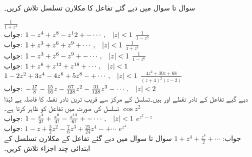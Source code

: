 سوال  تا سوال  میں دیے گئے تفاعل کا مکلارن تسلسل تلاش کریں۔

\quad
$\tfrac{1}{1+z^4}$\\
جواب:\quad
$1-z^4+z^8-z^12+-\cdots,\quad \abs{z}<1$
\quad
$\tfrac{1}{1-z^3}$\\
جواب:\quad
$1+z^3+z^6+z^9+\cdots,\quad \abs{z}<1$
\quad
$\tfrac{1}{1+z^3}$\\
جواب:\quad
$1-z^3+z^6-z^9+-\cdots,\quad \abs{z}<1$
\quad
$\tfrac{1}{1-z^6}$\\
جواب:\quad
$1+z^6+z^{12}+z^{18}+\cdots,\quad \abs{z}<1$\\
$1-2z^2+3z^4-4z^6+5z^8-+\cdots,\quad \abs{z}<1$
\quad
$\tfrac{4z^2+30z+68}{(z+4)^2(z-2)}$\\
جواب:\quad
$-\tfrac{17}{8}-\tfrac{15}{16}z-\tfrac{67}{128}z^2-\tfrac{31}{128}z^3-\cdots,\quad \abs{z}<2$\\
دیے گیے تفاعل کے نادر نقطے   اور  ہیں۔تسلسل کے مرکز  سے قریب ترین نادر نقطہ کا فاصلہ  ہے لہٰذا تسلسل  کی صورت میں تفاعل کو ظاہر کرتا ہے۔ 
\quad 
$\cos z^2$\\
جواب:\quad
$1-\tfrac{z^4}{2!}+\tfrac{z^8}{4!}-\tfrac{z^{12}}{6!}+-\cdots, \quad \abs{z}<1$
\quad 
$e^{z^2-z}$\\
جواب:\quad
$1-z+\tfrac{3}{2}z^2-\tfrac{7}{6}z^3+\tfrac{25}{24}z^4-+\cdots $
\quad 
$e^{z^4}$\\
جواب:\quad
$1+z^4+\frac{z^8}{2}+\cdots $
سوال  تا سوال  میں دیے گئے تفاعل کے مکلارن تسلسل کے ابتدائی چند اجزاء تلاش کریں۔

